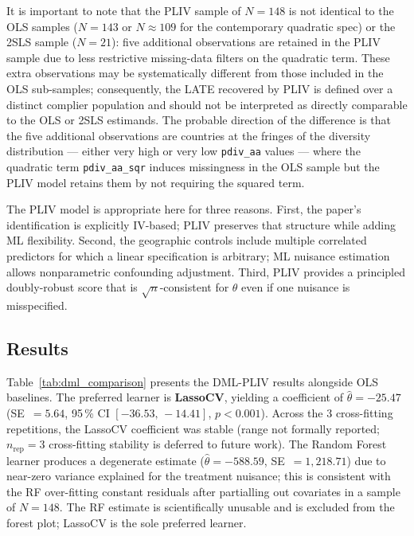 \documentclass[12pt,letterpaper]{article}
\begin{document}
It is important to note that the PLIV sample of $N=148$ is not identical to
the OLS samples ($N=143$ or $N \approx 109$ for the contemporary quadratic
spec) or the 2SLS sample ($N=21$): five additional observations are retained
in the PLIV sample due to less restrictive missing-data filters on the quadratic
term.
These extra observations may be systematically different from those included in
the OLS sub-samples; consequently, the LATE recovered by PLIV is defined over
a distinct complier population and should not be interpreted as directly
comparable to the OLS or 2SLS estimands.
The probable direction of the difference is that the five additional observations
are countries at the fringes of the diversity distribution --- either very high
or very low \texttt{pdiv\_aa} values --- where the quadratic term
\texttt{pdiv\_aa\_sqr} induces missingness in the OLS sample but the PLIV model
retains them by not requiring the squared term.

The PLIV model is appropriate here for three reasons.
First, the paper's identification is explicitly IV-based; PLIV preserves
that structure while adding ML flexibility.
Second, the geographic controls include multiple correlated predictors
for which a linear specification is arbitrary; ML nuisance estimation
allows nonparametric confounding adjustment.
Third, PLIV provides a principled doubly-robust score that is
$\sqrt{n}$-consistent for $\theta$ even if one nuisance is misspecified.

\subsection{Results}

Table~\ref{tab:dml_comparison} presents the DML-PLIV results alongside
OLS baselines.
The preferred learner is \textbf{LassoCV}, yielding a coefficient of
$\hat{\theta} = -25.47$ (SE~$= 5.64$, 95\,\% CI $[-36.53,\,-14.41]$,
$p < 0.001$).
Across the 3 cross-fitting repetitions, the LassoCV coefficient was stable
(range not formally reported; $n_{\mathrm{rep}} = 3$ cross-fitting stability
is deferred to future work).
The Random Forest learner produces a degenerate estimate
($\hat{\theta} = -588.59$, SE~$= 1{,}218.71$) due to near-zero variance
explained for the treatment nuisance; this is consistent with the
RF over-fitting constant residuals after partialling out covariates
in a sample of $N=148$. The RF estimate is scientifically unusable and
is excluded from the forest plot; LassoCV is the sole preferred learner.
\end{document}

